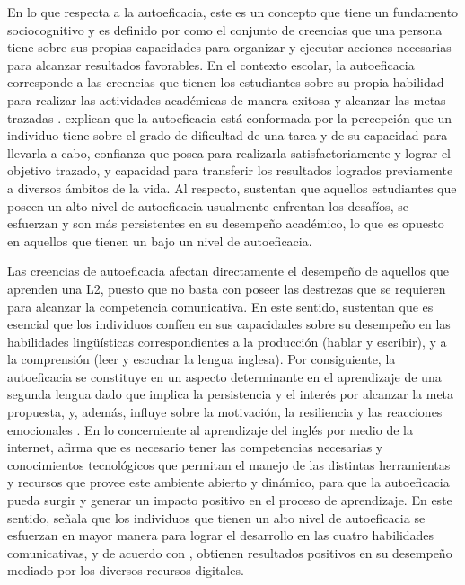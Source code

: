 \documentclass[spanish]{textolivre}
\begin{document}
En lo que respecta a la autoeficacia, este es un concepto que tiene un fundamento sociocognitivo y es definido por \textcite{bandura_self-efficacy:_1997} como el conjunto de creencias que una persona tiene sobre sus propias capacidades para organizar y ejecutar acciones necesarias para alcanzar resultados favorables. En el contexto escolar, la autoeficacia corresponde a las creencias que tienen los estudiantes sobre su propia habilidad para realizar las actividades académicas de manera exitosa y alcanzar las metas trazadas \cite{garcia_fernandez_predictive_2016}. \textcite{criollo_autoeficacia_2017} explican que la autoeficacia está conformada por la percepción que un individuo tiene sobre el grado de dificultad de una tarea y de su capacidad para llevarla a cabo, confianza que posea para realizarla satisfactoriamente y lograr el objetivo trazado, y capacidad para transferir los resultados logrados previamente a diversos ámbitos de la vida. Al respecto, \textcite{zhu_relationship_2020} sustentan que aquellos estudiantes que poseen un alto nivel de autoeficacia usualmente enfrentan los desafíos, se esfuerzan y son más persistentes en su desempeño académico, lo que es opuesto en aquellos que tienen un bajo un nivel de autoeficacia. 

Las creencias de autoeficacia afectan directamente el desempeño de aquellos que aprenden una L2, puesto que no basta con poseer las destrezas que se requieren para alcanzar la competencia comunicativa. En este sentido, \textcite{diaz_larenas_estudio_2013} sustentan que es esencial que los individuos confíen en sus capacidades sobre su desempeño en las habilidades lingüísticas correspondientes a la producción (hablar y escribir), y a la comprensión (leer y escuchar la lengua inglesa). Por consiguiente, la autoeficacia se constituye en un aspecto determinante en el aprendizaje de una segunda lengua dado que implica la persistencia y el interés por alcanzar la meta propuesta, y, además, influye sobre la motivación, la resiliencia y las reacciones emocionales \cite{goulao_relationship_2014}. En lo concerniente al aprendizaje del inglés por medio de la internet, \textcite{goulao_relationship_2014} afirma que es necesario tener las competencias necesarias y conocimientos tecnológicos que permitan el manejo de las distintas herramientas y recursos que provee este ambiente abierto y dinámico, para que la autoeficacia pueda surgir y generar un impacto positivo en el proceso de aprendizaje. En este sentido, \textcite{unveren_developing_2019} señala que los individuos que tienen un alto nivel de autoeficacia se esfuerzan en mayor manera para lograr el desarrollo en las cuatro habilidades comunicativas, y de acuerdo con \textcite{afifah_students_2021}, obtienen resultados positivos en su desempeño mediado por los diversos recursos digitales. 
\end{document}
